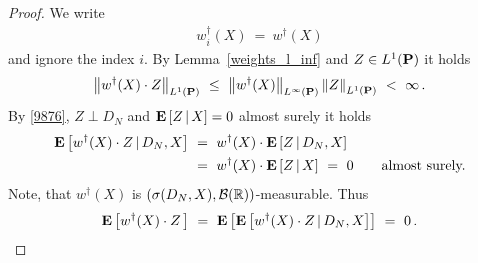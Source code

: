\begin{proof}
  We write
  \begin{gather*}
    w_i^\dagger(X)
  \ 
  =
  \ 
  w^\dagger(X)
  \end{gather*}
  and ignore the index $i$.
  By Lemma~\ref{weights_l_inf} and 
  $Z\in L^1(\P)$
  it holds
  \begin{gather}
    \label{9876}
    \norm{
  w^\dagger(X)\cdot Z
    }_{L^1(\P)}
    \ 
  \le
    \ 
  \norm{w^\dagger(X)}_{L^\infty(\P)}
  \norm{Z}_{L^1(\P)}
  \ 
  <
  \ 
  \infty
  \,.
  \end{gather}
  By 
  \eqref{9876},
  $Z\perp D_N$
  and
  $
\E
\left[
  Z
  \,
  |
  \, 
  X
\right]
= 0
  $
  almost surely
  it holds 
  \begin{align*}
    \E
  \left[
  w^\dagger(X)
  \cdot
  Z
  \,
  |
  \,
  D_N,X
  \right]
  &
  \ 
  =
  \ 
  w^\dagger(X)
  \cdot
  \E
  \left[
  Z
  \,
  |
  \,
  D_N,X
  \right]
  \\
  &
  \ 
  =
  \ 
  w^\dagger(X)
  \cdot
  \E
  \left[
  Z
  \,
  |
  \,
  X
  \right]
  \
  =
  \ 
  0
  \qquad
  \text{almost surely.}
  \end{align*}
  Note, that $w^\dagger(X)$ is 
  $
  \left(
  \sigma(D_N,X),\mathcal{B}(\R)
  \right)
  $-measurable.  
  Thus
  \begin{gather*}
    \E
    \left[
  w^\dagger(X)
  \cdot
  Z
  \,
    \right]
    \ 
    =
    \ 
    \E
    \left[
 \E
  \left[
  w^\dagger(X)
  \cdot
  Z
  \,
  |
  \,
  D_N,X
  \right]
    \right]
    \ 
    =
    \ 
    0
    \,.
     \end{gather*}
\end{proof}

